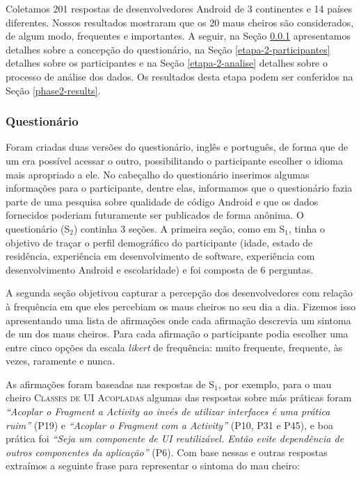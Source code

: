 Coletamos 201 respostas de desenvolvedores Android de 3 continentes e 14 países diferentes. Nossos resultados mostraram que os 20 maus cheiros são considerados, de algum modo, frequentes e importantes. A seguir, na Seção \ref{etapa-2-questionario} apresentamos detalhes sobre a concepção do questionário, na Seção \ref{etapa-2-participantes} detalhes sobre os participantes e na Seção \ref{etapa-2-analise} detalhes sobre o processo de análise dos dados. Os resultados desta etapa podem ser conferidos na Seção \ref{phase2-results}.

\subsubsection{Questionário}
\label{etapa-2-questionario}

Foram criadas duas versões do questionário, inglês e português, de forma que de um era possível acessar o outro, possibilitando o participante escolher o idioma mais apropriado a ele. No cabeçalho do questionário inserimos algumas informações para o participante, dentre elas, informamos que o questionário fazia parte de uma pesquisa sobre qualidade de código Android e que os dados fornecidos poderiam futuramente ser publicados de forma anônima. O questionário (S$_2$) continha 3 seções. A primeira seção, como em S$_1$, tinha o objetivo de traçar o perfil demográfico do participante (idade, estado de residência, experiência em desenvolvimento de software, experiência com desenvolvimento Android e escolaridade) e foi composta de 6 perguntas. 

A segunda seção objetivou capturar a percepção dos desenvolvedores com relação à frequência em que eles percebiam os maus cheiros no seu dia a dia. Fizemos isso apresentando uma lista de afirmações onde cada afirmação descrevia um sintoma de um dos maus cheiros. Para cada afirmação o participante podia escolher uma entre cinco opções da escala \textit{likert} de frequência: muito frequente, frequente, às vezes, raramente e nunca. 

As afirmações foram baseadas nas respostas de S$_1$, por exemplo, para o mau cheiro \textsc{\small Classes de UI Acopladas} algumas das respostas sobre más práticas foram \textit{``Acoplar o \textit{Fragment} a \textit{Activity} ao invés de utilizar interfaces é uma prática ruim''} (P19) e \textit{``Acoplar o \textit{Fragment} com a \textit{Activity}''} (P10, P31 e P45), e boa prática foi \textit{``Seja um componente de UI reutilizável. Então evite dependência de outros componentes da aplicação''} (P6). Com base nessas e outras respostas extraímos a seguinte frase para representar o sintoma do mau cheiro:

